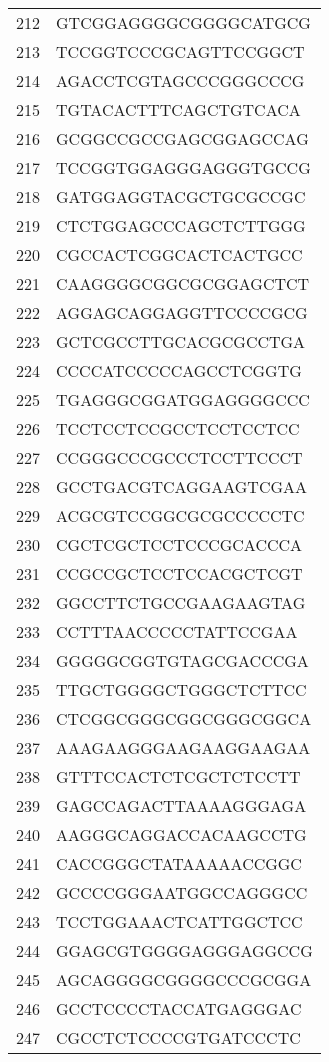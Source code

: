 \documentclass[letterpaper,12pt]{article}
\numberwithin{equation}{appendix}
\begin{document}
{{\begin{table}[ht]
\begin{tabular}{rl}
  212 & GTCGGAGGGGCGGGGCATGCG \\ 
  213 & TCCGGTCCCGCAGTTCCGGCT \\ 
  214 & AGACCTCGTAGCCCGGGCCCG \\ 
  215 & TGTACACTTTCAGCTGTCACA \\ 
  216 & GCGGCCGCCGAGCGGAGCCAG \\ 
  217 & TCCGGTGGAGGGAGGGTGCCG \\ 
  218 & GATGGAGGTACGCTGCGCCGC \\ 
  219 & CTCTGGAGCCCAGCTCTTGGG \\ 
  220 & CGCCACTCGGCACTCACTGCC \\ 
  221 & CAAGGGGCGGCGCGGAGCTCT \\ 
  222 & AGGAGCAGGAGGTTCCCCGCG \\ 
  223 & GCTCGCCTTGCACGCGCCTGA \\ 
  224 & CCCCATCCCCCAGCCTCGGTG \\ 
  225 & TGAGGGCGGATGGAGGGGCCC \\ 
  226 & TCCTCCTCCGCCTCCTCCTCC \\ 
  227 & CCGGGCCCGCCCTCCTTCCCT \\ 
  228 & GCCTGACGTCAGGAAGTCGAA \\ 
  229 & ACGCGTCCGGCGCGCCCCCTC \\ 
  230 & CGCTCGCTCCTCCCGCACCCA \\ 
  231 & CCGCCGCTCCTCCACGCTCGT \\ 
  232 & GGCCTTCTGCCGAAGAAGTAG \\ 
  233 & CCTTTAACCCCCTATTCCGAA \\ 
  234 & GGGGGCGGTGTAGCGACCCGA \\ 
  235 & TTGCTGGGGCTGGGCTCTTCC \\ 
  236 & CTCGGCGGGCGGCGGGCGGCA \\ 
  237 & AAAGAAGGGAAGAAGGAAGAA \\ 
  238 & GTTTCCACTCTCGCTCTCCTT \\ 
  239 & GAGCCAGACTTAAAAGGGAGA \\ 
  240 & AAGGGCAGGACCACAAGCCTG \\ 
  241 & CACCGGGCTATAAAAACCGGC \\ 
  242 & GCCCCGGGAATGGCCAGGGCC \\ 
  243 & TCCTGGAAACTCATTGGCTCC \\ 
  244 & GGAGCGTGGGGAGGGAGGCCG \\ 
  245 & AGCAGGGGCGGGGCCCGCGGA \\ 
  246 & GCCTCCCCTACCATGAGGGAC \\ 
  247 & CGCCTCTCCCCGTGATCCCTC \\ 

\end{tabular}
\end{table}}}
\end{document}

